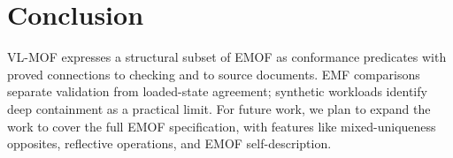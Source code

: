 \section{Conclusion}\label{sec:conclusion}
VL-MOF expresses a structural subset of EMOF as conformance predicates with
proved connections to checking and to source documents.
EMF comparisons separate validation from loaded-state agreement;
synthetic workloads identify deep containment as a practical limit. For future
work, we plan to expand the work to cover the full EMOF specification, with
features like mixed-uniqueness opposites, reflective operations, and EMOF
self-description.
